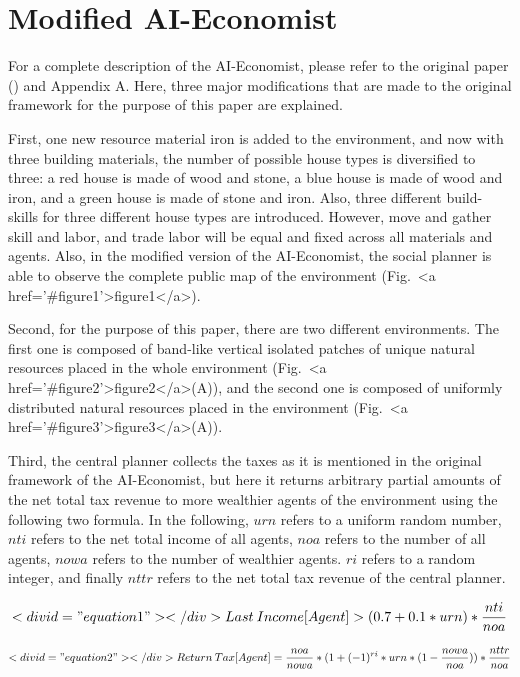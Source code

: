 \documentclass{article}
\begin{document}
\section{Modified AI-Economist}
For a complete description of the AI-Economist, please refer to the original paper (\citep{Zheng2022}) and Appendix A. Here, three major modifications that are made to the original framework for the purpose of this paper are explained. 

First, one new resource material \textendash iron \textendash is added to the environment, and now with three building materials, the number of possible house types is diversified to three: a red house is made of wood and stone, a blue house is made of wood and iron, and a green house is made of stone and iron. Also, three different build-skills for three different house types are introduced. However, move and gather skill and labor, and trade labor will be equal and fixed across all materials and agents. Also, in the modified version of the AI-Economist, the social planner is able to observe the complete public map of the environment (Fig.~<a href='#figure1'>figure1</a>).

Second, for the purpose of this paper, there are two different environments. The first one is composed of band-like vertical isolated patches of unique natural resources placed in the whole environment (Fig.~<a href='#figure2'>figure2</a>(A)), and the second one is composed of uniformly distributed natural resources placed in the environment (Fig.~<a href='#figure3'>figure3</a>(A)).

Third, the central planner collects the taxes as it is mentioned in the original framework of the AI-Economist, but here it returns arbitrary partial amounts of the net total tax revenue to more wealthier agents of the environment using the following two formula. In the following, \( urn \) refers to a uniform random number, \( nti \) refers to the net total income of all agents, \( noa \) refers to the number of all agents, \( nowa \) refers to the number of wealthier agents. \( ri \) refers to a random integer, and finally \( nttr \) refers to the net total tax revenue of the central planner.

\begin{equation}<div id="equation1"></div>

Last\:Income[Agent] > (0.7 + 0.1 * urn) * \frac{nti}{noa}
\end{equation}

\begin{equation}<div id="equation2"></div>

Return\:Tax[Agent] = \frac{noa}{nowa} * (1 + (-1)^{ri} * urn * (1 - \frac{nowa}{noa})) * \frac{nttr}{noa}
\end{equation}
\end{document}
